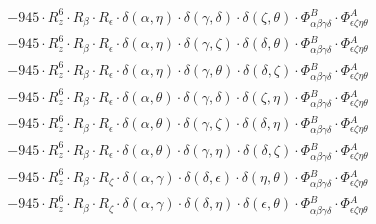 \documentclass{article}
\begin{document}
\begin{equation}
\begin{array}{c}
 \\[0.2em] 		 - 945 \cdot R_{z}^{6} \cdot R_{\beta{}} \cdot R_{\epsilon{}} \cdot \delta{}\left(\alpha{}, \eta{}\right) \cdot \delta{}\left(\gamma{}, \delta{}\right) \cdot \delta{}\left(\zeta{}, \theta{}\right) \cdot \Phi{}^{B}_{\alpha{}\beta{}\gamma{}\delta{}} \cdot \Phi{}^{A}_{\epsilon{}\zeta{}\eta{}\theta{}} 
 \\[0.2em] 		 - 945 \cdot R_{z}^{6} \cdot R_{\beta{}} \cdot R_{\epsilon{}} \cdot \delta{}\left(\alpha{}, \eta{}\right) \cdot \delta{}\left(\gamma{}, \zeta{}\right) \cdot \delta{}\left(\delta{}, \theta{}\right) \cdot \Phi{}^{B}_{\alpha{}\beta{}\gamma{}\delta{}} \cdot \Phi{}^{A}_{\epsilon{}\zeta{}\eta{}\theta{}} 
 \\[0.2em] 		 - 945 \cdot R_{z}^{6} \cdot R_{\beta{}} \cdot R_{\epsilon{}} \cdot \delta{}\left(\alpha{}, \eta{}\right) \cdot \delta{}\left(\gamma{}, \theta{}\right) \cdot \delta{}\left(\delta{}, \zeta{}\right) \cdot \Phi{}^{B}_{\alpha{}\beta{}\gamma{}\delta{}} \cdot \Phi{}^{A}_{\epsilon{}\zeta{}\eta{}\theta{}} 
 \\[0.2em] 		 - 945 \cdot R_{z}^{6} \cdot R_{\beta{}} \cdot R_{\epsilon{}} \cdot \delta{}\left(\alpha{}, \theta{}\right) \cdot \delta{}\left(\gamma{}, \delta{}\right) \cdot \delta{}\left(\zeta{}, \eta{}\right) \cdot \Phi{}^{B}_{\alpha{}\beta{}\gamma{}\delta{}} \cdot \Phi{}^{A}_{\epsilon{}\zeta{}\eta{}\theta{}} 
 \\[0.2em] 		 - 945 \cdot R_{z}^{6} \cdot R_{\beta{}} \cdot R_{\epsilon{}} \cdot \delta{}\left(\alpha{}, \theta{}\right) \cdot \delta{}\left(\gamma{}, \zeta{}\right) \cdot \delta{}\left(\delta{}, \eta{}\right) \cdot \Phi{}^{B}_{\alpha{}\beta{}\gamma{}\delta{}} \cdot \Phi{}^{A}_{\epsilon{}\zeta{}\eta{}\theta{}} 
 \\[0.2em] 		 - 945 \cdot R_{z}^{6} \cdot R_{\beta{}} \cdot R_{\epsilon{}} \cdot \delta{}\left(\alpha{}, \theta{}\right) \cdot \delta{}\left(\gamma{}, \eta{}\right) \cdot \delta{}\left(\delta{}, \zeta{}\right) \cdot \Phi{}^{B}_{\alpha{}\beta{}\gamma{}\delta{}} \cdot \Phi{}^{A}_{\epsilon{}\zeta{}\eta{}\theta{}} 
 \\[0.2em] 		 - 945 \cdot R_{z}^{6} \cdot R_{\beta{}} \cdot R_{\zeta{}} \cdot \delta{}\left(\alpha{}, \gamma{}\right) \cdot \delta{}\left(\delta{}, \epsilon{}\right) \cdot \delta{}\left(\eta{}, \theta{}\right) \cdot \Phi{}^{B}_{\alpha{}\beta{}\gamma{}\delta{}} \cdot \Phi{}^{A}_{\epsilon{}\zeta{}\eta{}\theta{}} 
 \\[0.2em] 		 - 945 \cdot R_{z}^{6} \cdot R_{\beta{}} \cdot R_{\zeta{}} \cdot \delta{}\left(\alpha{}, \gamma{}\right) \cdot \delta{}\left(\delta{}, \eta{}\right) \cdot \delta{}\left(\epsilon{}, \theta{}\right) \cdot \Phi{}^{B}_{\alpha{}\beta{}\gamma{}\delta{}} \cdot \Phi{}^{A}_{\epsilon{}\zeta{}\eta{}\theta{}} 

\end{array}
\end{equation}
\end{document}
